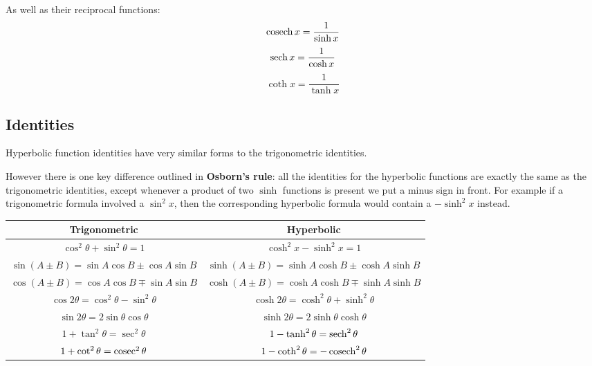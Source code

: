 As well as their reciprocal functions:
\begin{equation}
\operatorname{cosech} x = \frac{1}{\sinh x}
\end{equation}
\begin{equation}
\sech x = \frac{1}{\cosh x}
\end{equation}
\begin{equation}
\coth x = \frac{1}{\tanh x}
\end{equation}

\subsection{Identities}
Hyperbolic function identities have very similar forms to the trigonometric identities. 

However there is one key difference outlined in \textbf{Osborn's rule}: all the identities for the hyperbolic functions are exactly the same as the trigonometric identities, except whenever a product of two $\sinh$ functions is present we put a minus sign in front. For example if a trigonometric formula involved a $\sin^2x$, then the corresponding hyperbolic formula would contain a $-\sinh^2x$ instead.

\begin{table}[H]
\centering
\begin{tabular}{c|c}
\hline\hline
Trigonometric & Hyperbolic \\
\hline
$\cos^2\theta + \sin^2\theta = 1$ & $\cosh^2x - \sinh^2x = 1$ \\
$\sin(A \pm B) = \sin A \cos B \pm \cos A \sin B$ & $\sinh(A \pm B) = \sinh A \cosh B \pm \cosh A \sinh B$ \\
$\cos(A \pm B) = \cos A \cos B \mp \sin A \sin B$ & $\cosh(A \pm B) = \cosh A \cosh B \mp \sinh A \sinh B$ \\
$\cos 2\theta = \cos^2\theta - \sin^2\theta$ & $\cosh 2\theta = \cosh^2\theta + \sinh^2\theta$ \\
$\sin 2\theta = 2 \sin\theta \cos\theta$ & $\sinh 2\theta = 2 \sinh\theta \cosh\theta$ \\
$1 + \tan^2\theta = \sec^2\theta$ & $1 - \tanh^2\theta = \sech^2\theta$ \\
$1 + \cot^2\theta = \operatorname{cosec}^2\theta$ & $1 - \coth^2\theta = - \operatorname{cosech}^2\theta$ \\
\hline\hline
\end{tabular}
\end{table}
\pagebreak

